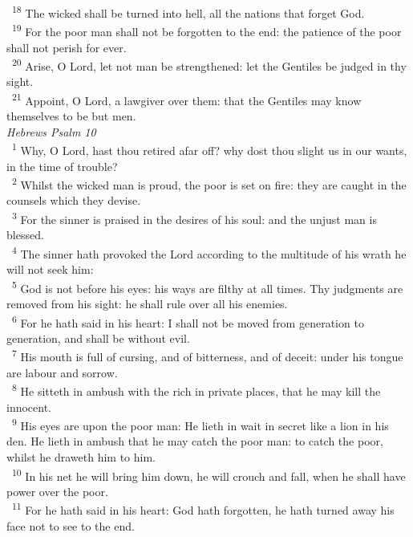 \documentclass[a5paper,12pt]{article}
\begin{document}
\begin{multicols*}{2}
~\textsuperscript{18} The wicked shall be turned into hell, all the nations that forget God.\\
~\textsuperscript{19} For the poor man shall not be forgotten to the end: the patience of the poor shall not perish for ever.\\
~\textsuperscript{20} Arise, O Lord, let not man be strengthened: let the Gentiles be judged in thy sight.\\
~\textsuperscript{21} Appoint, O Lord, a lawgiver over them: that the Gentiles may know themselves to be but men.\\

\emph{Hebrews Psalm 10}\\

~\textsuperscript{1} Why, O Lord, hast thou retired afar off? why dost thou slight us in our wants, in the time of trouble?\\
~\textsuperscript{2} Whilst the wicked man is proud, the poor is set on fire: they are caught in the counsels which they devise.\\
~\textsuperscript{3} For the sinner is praised in the desires of his soul: and the unjust man is blessed.\\
~\textsuperscript{4} The sinner hath provoked the Lord according to the multitude of his wrath he will not seek him:\\
~\textsuperscript{5} God is not before his eyes: his ways are filthy at all times. Thy judgments are removed from his sight: he shall rule over all his enemies.\\
~\textsuperscript{6} For he hath said in his heart: I shall not be moved from generation to generation, and shall be without evil.\\
~\textsuperscript{7} His mouth is full of cursing, and of bitterness, and of deceit: under his tongue are labour and sorrow.\\
~\textsuperscript{8} He sitteth in ambush with the rich in private places, that he may kill the innocent.\\
~\textsuperscript{9} His eyes are upon the poor man: He lieth in wait in secret like a lion in his den. He lieth in ambush that he may catch the poor man: to catch the poor, whilst he draweth him to him.\\
~\textsuperscript{10} In his net he will bring him down, he will crouch and fall, when he shall have power over the poor.\\
~\textsuperscript{11} For he hath said in his heart: God hath forgotten, he hath turned away his face not to see to the end.\\

\end{multicols*}
\end{document}
